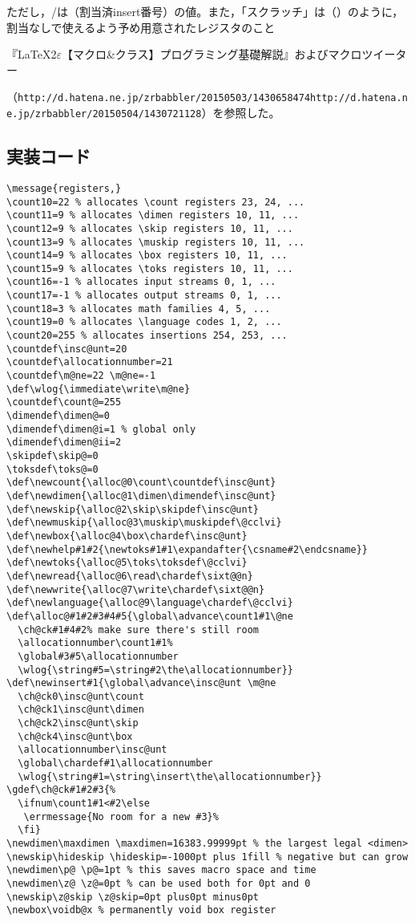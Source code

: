 \documentclass[autodetect-engine,dvipdfmx]{jsarticle}
\begin{document}
ただし，/は（割当済insert番号）の値。また，「スクラッチ」は（）のように，割当なしで使えるよう予め用意されたレジスタのこと

{\footnotesize『\LaTeX2$\varepsilon$【マクロ\&クラス】プログラミング基礎解説』およびマクロツイーター\par
\noindent（\texttt{http://d.hatena.ne.jp/zrbabbler/20150503/1430658474}\hspace{1zw}\texttt{http://d.hatena.ne.jp/zrbabbler/20150504/1430721128}）を参照した。}


\subsection{実装コード}

\latexltx
\begin{lstlisting}[firstnumber=302]
\message{registers,}
\count10=22 % allocates \count registers 23, 24, ...
\count11=9 % allocates \dimen registers 10, 11, ...
\count12=9 % allocates \skip registers 10, 11, ...
\count13=9 % allocates \muskip registers 10, 11, ...
\count14=9 % allocates \box registers 10, 11, ...
\count15=9 % allocates \toks registers 10, 11, ...
\count16=-1 % allocates input streams 0, 1, ...
\count17=-1 % allocates output streams 0, 1, ...
\count18=3 % allocates math families 4, 5, ...
\count19=0 % allocates \language codes 1, 2, ...
\count20=255 % allocates insertions 254, 253, ...
\countdef\insc@unt=20
\countdef\allocationnumber=21
\countdef\m@ne=22 \m@ne=-1
\def\wlog{\immediate\write\m@ne}
\countdef\count@=255
\dimendef\dimen@=0
\dimendef\dimen@i=1 % global only
\dimendef\dimen@ii=2
\skipdef\skip@=0
\toksdef\toks@=0
\def\newcount{\alloc@0\count\countdef\insc@unt}
\def\newdimen{\alloc@1\dimen\dimendef\insc@unt}
\def\newskip{\alloc@2\skip\skipdef\insc@unt}
\def\newmuskip{\alloc@3\muskip\muskipdef\@cclvi}
\def\newbox{\alloc@4\box\chardef\insc@unt}
\def\newhelp#1#2{\newtoks#1#1\expandafter{\csname#2\endcsname}}
\def\newtoks{\alloc@5\toks\toksdef\@cclvi}
\def\newread{\alloc@6\read\chardef\sixt@@n}
\def\newwrite{\alloc@7\write\chardef\sixt@@n}
\def\newlanguage{\alloc@9\language\chardef\@cclvi}
\def\alloc@#1#2#3#4#5{\global\advance\count1#1\@ne
  \ch@ck#1#4#2% make sure there's still room
  \allocationnumber\count1#1%
  \global#3#5\allocationnumber
  \wlog{\string#5=\string#2\the\allocationnumber}}
\def\newinsert#1{\global\advance\insc@unt \m@ne
  \ch@ck0\insc@unt\count
  \ch@ck1\insc@unt\dimen
  \ch@ck2\insc@unt\skip
  \ch@ck4\insc@unt\box
  \allocationnumber\insc@unt
  \global\chardef#1\allocationnumber
  \wlog{\string#1=\string\insert\the\allocationnumber}}
\gdef\ch@ck#1#2#3{%
  \ifnum\count1#1<#2\else
   \errmessage{No room for a new #3}%
  \fi}
\newdimen\maxdimen \maxdimen=16383.99999pt % the largest legal <dimen>
\newskip\hideskip \hideskip=-1000pt plus 1fill % negative but can grow
\newdimen\p@ \p@=1pt % this saves macro space and time
\newdimen\z@ \z@=0pt % can be used both for 0pt and 0
\newskip\z@skip \z@skip=0pt plus0pt minus0pt
\newbox\voidb@x % permanently void box register
\end{lstlisting}
\end{document}
